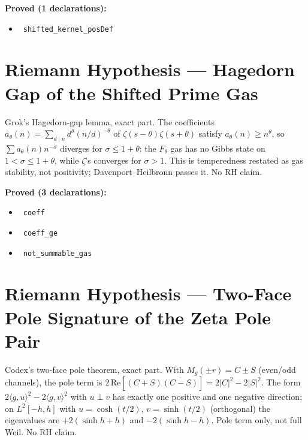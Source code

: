 \documentclass{report}
\theoremstyle{definition}
\begin{document}
\noindent\textbf{Proved (1 declarations):}
\begin{itemize}
  \item {}\leanok\ \texttt{shifted\_kernel\_posDef}
\end{itemize}

\section{Riemann Hypothesis --- Hagedorn Gap of the Shifted Prime Gas}
Grok's Hagedorn-gap lemma, exact part. The coefficients $a_\theta(n)=\sum_{d\mid n}d^\theta(n/d)^{-\theta}$ of $\zeta(s-\theta)\zeta(s+\theta)$ satisfy $a_\theta(n)\ge n^\theta$, so $\sum a_\theta(n)n^{-\sigma}$ diverges for $\sigma\le1+\theta$: the $F_\theta$ gas has no Gibbs state on $1<\sigma\le1+\theta$, while $\zeta$'s converges for $\sigma>1$. This is temperedness restated as gas stability, not positivity; Davenport--Heilbronn passes it. No RH claim.

\noindent\textbf{Proved (3 declarations):}
\begin{itemize}
  \item {}\leanok\ \texttt{coeff}
  \item {}\leanok\ \texttt{coeff\_ge}
  \item {}\leanok\ \texttt{not\_summable\_gas}
\end{itemize}

\section{Riemann Hypothesis --- Two-Face Pole Signature of the Zeta Pole Pair}
Codex's two-face pole theorem, exact part. With $M_g(\pm r)=C\pm S$ (even/odd channels), the pole term is $2\,\mathrm{Re}[(C+S)\overline{(C-S)}]=2|C|^2-2|S|^2$. The form $2\langle g,u\rangle^2-2\langle g,v\rangle^2$ with $u\perp v$ has exactly one positive and one negative direction; on $L^2[-h,h]$ with $u=\cosh(t/2)$, $v=\sinh(t/2)$ (orthogonal) the eigenvalues are $+2(\sinh h+h)$ and $-2(\sinh h-h)$. Pole term only, not full Weil. No RH claim.
\end{document}
